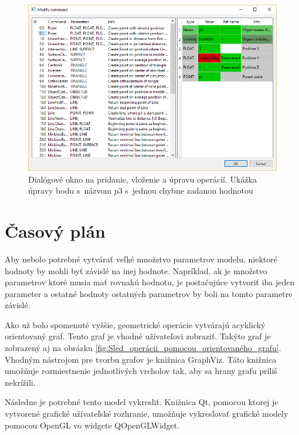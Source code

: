 \begin{figure}[hbt]
	\centering
	\includegraphics[width=1\textwidth]{obrazky-figures/Dialog.png}
	\caption{Dialógové okno na pridanie, vloženie a úpravu operácií. Ukážka úpravy bodu s~názvom $p3$ s~jednou chybne zadanou hodnotou }
	\label{fig:dialogWindow}
\end{figure}

\chapter{Časový plán}

Aby nebolo potrebné vytvárať veľké množstvo parametrov modelu, niektoré hodnoty by mohli byť závislé na inej hodnote. Napríklad, ak je množstvo parametrov ktoré musia mať rovnakú hodnotu, je postačujúce vytvoriť iba jeden parameter a ostatné hodnoty ostatných parametrov by boli na tomto parametre závislé. 

Ako už bolo spomenuté vyššie, geometrické operácie vytvárajú acyklický orientovaný graf. Tento graf je vhodné užívateľovi zobraziť. Takýto graf je zobrazený aj na obrázku \ref{fig:Sled_operácii_pomocou_orientovaného_grafu}. Vhodným nástrojom pre tvorbu grafov je knižnica GraphViz. Táto knižnica umožňuje rozmiestnenie jednotlivých vrcholov tak, aby sa hrany grafu príliš nekrížili. 


Následne je potrebné tento model vykresliť. Knižnica Qt, pomocou ktorej je vytvorené grafické užívateľské rozhranie,  umožňuje vykresľovať grafické modely pomocou OpenGL vo widgete QOpenGLWidget.

